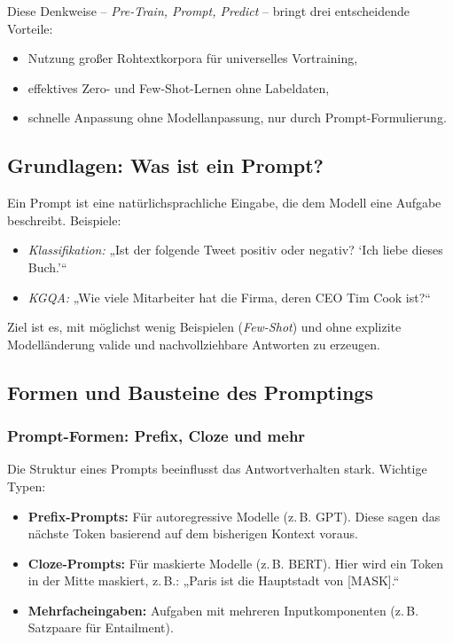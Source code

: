 Diese Denkweise – \emph{Pre-Train, Prompt, Predict} – bringt drei entscheidende Vorteile:
\begin{itemize}
  \item Nutzung großer Rohtextkorpora für universelles Vortraining,
  \item effektives Zero- und Few-Shot-Lernen ohne Labeldaten,
  \item schnelle Anpassung ohne Modellanpassung, nur durch Prompt-Formulierung.
\end{itemize}

\subsection{Grundlagen: Was ist ein Prompt?}

Ein Prompt ist eine natürlichsprachliche Eingabe, die dem Modell eine Aufgabe beschreibt. Beispiele:
\begin{itemize}
  \item \emph{Klassifikation:} „Ist der folgende Tweet positiv oder negativ? ‘Ich liebe dieses Buch.’“
  \item \emph{KGQA:} „Wie viele Mitarbeiter hat die Firma, deren CEO Tim Cook ist?“
\end{itemize}

Ziel ist es, mit möglichst wenig Beispielen (\emph{Few-Shot}) und ohne explizite Modelländerung valide und nachvollziehbare Antworten zu erzeugen.

\subsection{Formen und Bausteine des Promptings}

\subsubsection{Prompt-Formen: Prefix, Cloze und mehr}

Die Struktur eines Prompts beeinflusst das Antwortverhalten stark. Wichtige Typen:
\begin{itemize}
  \item \textbf{Prefix-Prompts:} Für autoregressive Modelle (z.\,B. GPT). Diese sagen das nächste Token basierend auf dem bisherigen Kontext voraus.
  \item \textbf{Cloze-Prompts:} Für maskierte Modelle (z.\,B. BERT). Hier wird ein Token in der Mitte maskiert, z.\,B.: „Paris ist die Hauptstadt von [MASK].“
  \item \textbf{Mehrfacheingaben:} Aufgaben mit mehreren Inputkomponenten (z.\,B. Satzpaare für Entailment).
\end{itemize}

